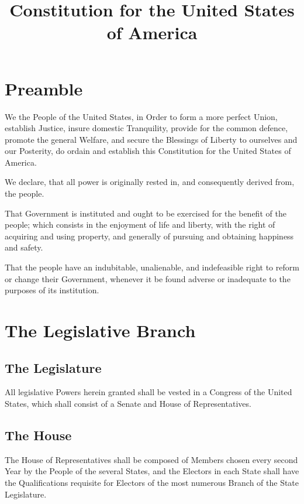 \documentclass{constitution}
\title{Constitution for the United States of America}
\begin{document}
\maketitle
\tableofcontents*

\newpage
\maketitle
\chapter*{Preamble}
We the People of the United States,
in Order to form a more perfect Union, establish Justice,
insure domestic Tranquility, provide for the common defence,
promote the general Welfare,
and secure the Blessings of Liberty to ourselves and our Posterity,
do ordain and establish this Constitution for the United States of America.

We declare,
that all power is originally rested in,
and consequently derived from,
the people.

That Government is instituted and ought to be exercised for the benefit of the people;
which consists in the enjoyment of life and liberty,
with the right of acquiring and using property,
and generally of pursuing and obtaining happiness and safety.

That the people have an indubitable, unalienable, and indefeasible right
to reform or change their Government,
whenever it be found adverse or inadequate to the purposes of its institution.

\chapter{The Legislative Branch}
\section{The Legislature}
All legislative Powers herein granted shall be vested in a Congress of the United States,
which shall consist of a Senate and House of Representatives.

\section{The House}
The House of Representatives shall be composed of Members
chosen every second Year by the People of the several States,
and the Electors in each State shall have the Qualifications
requisite for Electors of the most numerous Branch of the State Legislature.
\end{document}
